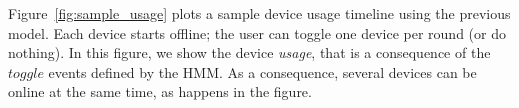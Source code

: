 
Figure~\ref{fig:sample_usage} plots a sample device usage timeline using the previous model. 
Each device starts offline; the user can toggle one device per round (or do nothing).
In this figure, we show the device \emph{usage}, that is a consequence of the $\mathit{toggle}$ events defined by the HMM.
As a consequence, several devices can be online at the same time, as happens in the figure.





